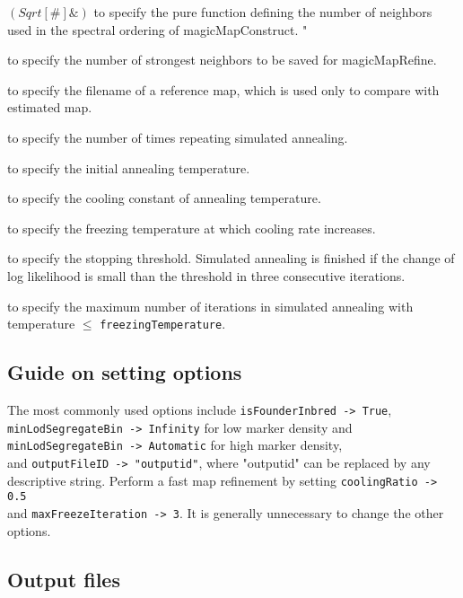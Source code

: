 \documentclass[12pt]{article}
\begin{document}
\begin{description}[noitemsep]
\item[nNeighborFunction ->]$(Sqrt[\#]\&)$ to specify the pure function defining the number of neighbors used in the spectral ordering of magicMapConstruct. "
\item[nNeighborSaving -> 10] to specify the number of strongest neighbors to be saved for magicMapRefine. 
\item[referenceMap -> None] to specify the filename of a reference map, which is used only to compare with estimated map.  
\item[nReplicateAnnealing -> 1] to specify the number of times repeating simulated annealing. 
\item[initTemperature -> 2] to specify the initial annealing temperature. 
\item[coolingRatio -> 0.85] to specify the cooling constant of annealing temperature. 
\item[freezingTemperature -> 0.5] to specify the freezing temperature at which cooling rate increases. 
\item[deltLoglThreshold -> 1] to specify the stopping threshold. Simulated annealing is finished if the change of log likelihood is 
small than the threshold in three consecutive iterations. 
\item[maxFreezeIteration -> 15] to specify the maximum number of iterations in simulated annealing with temperature $\le$  \verb|freezingTemperature|.
\end{description}

\subsection{Guide on setting options}

The most commonly used options include \verb|isFounderInbred -> True|, \\
\verb|minLodSegregateBin -> Infinity| for low marker density and \\ \verb|minLodSegregateBin -> Automatic| for high marker density, \\ and \verb|outputFileID -> "outputid"|, where "outputid" can be replaced by any descriptive string. Perform a fast map refinement by setting \verb|coolingRatio -> 0.5| \\ and \verb|maxFreezeIteration -> 3|. It is generally unnecessary to change the other options.  

\subsection{Output files}
\end{document}
